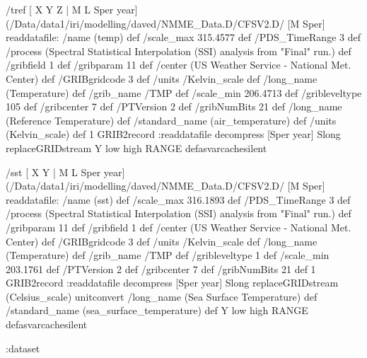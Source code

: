 \begin{ingrid}
 /tref{
[ X Y Z | M L Sper year] 
(/Data/data1/iri/modelling/daved/NMME_Data.D/CFSV2.D/%
 [M Sper]
readdatafile:
/name (temp) def
 /scale_max 315.4577 def
 /PDS_TimeRange 3 def
 /process (Spectral Statistical Interpolation (SSI) analysis from "Final" run.) def
 /gribfield 1 def
 /gribparam 11 def
 /center (US Weather Service - National Met. Center) def
 /GRIBgridcode 3 def
 /units /Kelvin_scale def
 /long_name (Temperature) def
 /grib_name /TMP def
 /scale_min 206.4713 def
 /gribleveltype 105 def
 /gribcenter 7 def
 /PTVersion 2 def
 /gribNumBits 21 def
/long_name (Reference Temperature) def
/standard_name (air_temperature) def
/units (Kelvin_scale) def
 1 GRIB2record :readdatafile
decompress
[Sper year] Slong replaceGRIDstream
Y low high RANGE
}defasvarcachesilent
\end{ingrid}
\begin{ingrid}
 /sst{
[ X Y | M L Sper year] 
(/Data/data1/iri/modelling/daved/NMME_Data.D/CFSV2.D/%
 [M Sper]
readdatafile:
/name (sst) def
 /scale_max 316.1893 def
 /PDS_TimeRange 3 def
 /process (Spectral Statistical Interpolation (SSI) analysis from "Final" run.) def
 /gribparam 11 def
 /gribfield 1 def
 /center (US Weather Service - National Met. Center) def
 /GRIBgridcode 3 def
 /units /Kelvin_scale def
 /long_name (Temperature) def
 /grib_name /TMP def
 /gribleveltype 1 def
 /scale_min 203.1761 def
 /PTVersion 2 def
 /gribcenter 7 def
 /gribNumBits 21 def
1 GRIB2record :readdatafile
decompress
[Sper year] Slong replaceGRIDstream
(Celsius_scale) unitconvert
/long_name (Sea Surface Temperature) def
/standard_name (sea_surface_temperature) def
Y low high RANGE
}defasvarcachesilent
\end{ingrid}
\begin{ingrid}
:dataset
\end{ingrid}
